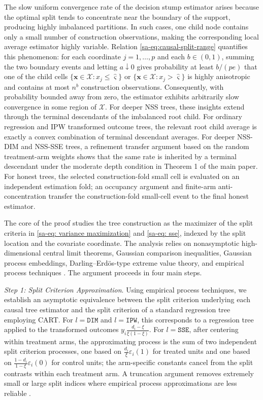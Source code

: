 \documentclass[10pt]{article}
\def\bx{\mathbf{x}}
\def\DIM{\mathtt{DIM}}
\def\IPW{\mathtt{IPW}}
\def\SSE{\mathtt{SSE}}
\theoremstyle{definition}
\theoremstyle{remark}
\begin{document}
The slow uniform convergence rate of the decision stump estimator arises because the optimal split tends to concentrate near the boundary of the support, producing highly imbalanced partitions. In such cases, one child node contains only a small number of construction observations, making the corresponding local average estimator highly variable. Relation \eqref{sa-eq:causal-split-range} quantifies this phenomenon: for each coordinate $j=1,\dots,p$ and each $b\in(0,1)$, summing the two boundary events and letting $a\downarrow0$ gives probability at least $b/(pe)$ that one of the child cells $\{ \bx \in \mathcal{X}: x_j \leq \hat \varsigma \} $ or $\{ \bx \in \mathcal{X}: x_j > \hat \varsigma \} $ is highly anisotropic and contains at most $n^b$ construction observations. Consequently, with probability bounded away from zero, the estimator exhibits arbitrarily slow convergence in some region of $\mathcal{X}$. For deeper NSS trees, these insights extend through the terminal descendants of the imbalanced root child. For ordinary regression and IPW transformed outcome trees, the relevant root child average is exactly a convex combination of terminal descendant averages. For deeper NSS-DIM and NSS-SSE trees, a refinement transfer argument based on the random treatment-arm weights shows that the same rate is inherited by a terminal descendant under the moderate depth condition in Theorem 1 of the main paper. For honest trees, the selected construction-fold small cell is evaluated on an independent estimation fold; an occupancy argument and finite-arm anti-concentration transfer the construction-fold small-cell event to the final honest estimator.

The core of the proof studies the tree construction as the maximizer of the split criteria in \eqref{sa-eq: variance maximization} and \eqref{sa-eq: sse}, indexed by the split location and the covariate coordinate. The analysis relies on nonasymptotic high-dimensional central limit theorems, Gaussian comparison inequalities, Gaussian process embeddings, Darling--Erd\"os-type extreme value theory, and empirical process techniques \citep{el2009transductive,petrov2007lower,shorack1976inequalities,skorski_2023}. The argument proceeds in four main steps.

\emph{Step 1: Split Criterion Approximation}.
Using empirical process techniques, we establish an asymptotic equivalence between the split criterion underlying each causal tree estimator and the split criterion of a standard regression tree employing CART. For $l=\DIM$ and $l=\IPW$, this corresponds to a regression tree applied to the transformed outcomes $y_i \frac{d_i-\xi}{\xi(1-\xi)}$. For $l=\SSE$, after centering within treatment arms, the approximating process is the sum of two independent split criterion processes, one based on $\frac{d_i}{\xi}\varepsilon_i(1)$ for treated units and one based on $\frac{1-d_i}{1-\xi}\varepsilon_i(0)$ for control units; the arm-specific constants cancel from the split contrasts within each treatment arm. A truncation argument removes extremely small or large split indices where empirical process approximations are less reliable \citep[Theorem A.4.1]{csorgo1997limit}.
\end{document}

